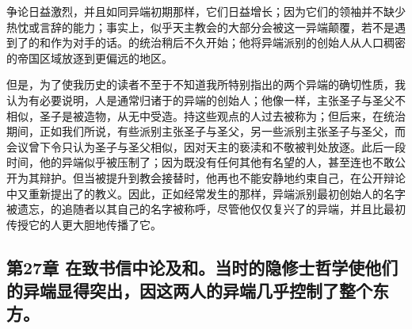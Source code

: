 争论日益激烈，并且如同异端初期那样，它们日益增长；因为它们的领袖并不缺少热忱或言辞的能力；事实上，似乎天主教会的大部分会被这一异端颠覆，若不是遇到了的和作为对手的话。的统治稍后不久开始；他将异端派别的创始人从人口稠密的帝国区域放逐到更偏远的地区。\par

但是，为了使我历史的读者不至于不知道我所特别指出的两个异端的确切性质，我认为有必要说明，人是通常归诸于的异端的创始人；他像一样，主张圣子与圣父不相似，圣子是被造物，从无中受造。持这些观点的人过去被称为；但后来，在统治期间，正如我们所说，有些派别主张圣子与圣父，另一些派别主张圣子与圣父，而会议曾下令只认为圣子与圣父相似，因对天主的亵渎和不敬被判处放逐。此后一段时间，他的异端似乎被压制了；因为既没有任何其他有名望的人，甚至连也不敢公开为其辩护。但当被提升到教会接替时，他再也不能安静地约束自己，在公开辩论中又重新提出了的教义。因此，正如经常发生的那样，异端派别最初创始人的名字被遗忘，的追随者以其自己的名字被称呼，尽管他仅仅复兴了的异端，并且比最初传授它的人更大胆地传播了它。\par


\subsection{第27章 在致书信中论及和。当时的隐修士哲学使他们的异端显得突出，因这两人的异端几乎控制了整个东方。}

